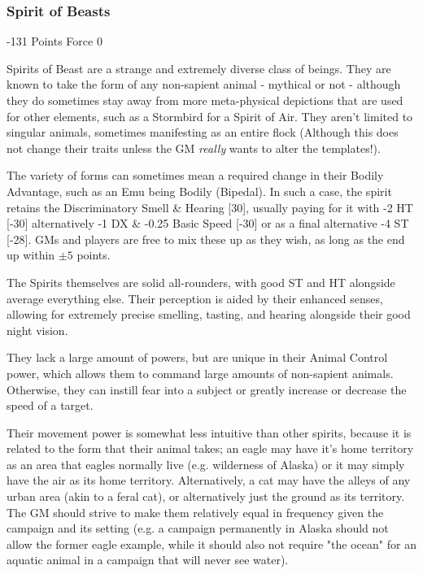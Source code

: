 \begin{multicols*}{3}
	\subsubsection{Spirit of Beasts}
	\begin{flushright}
		-131 Points Force 0
	\end{flushright}
	
	Spirits of Beast are a strange and extremely diverse class of beings. They are known to take the form of any non-sapient animal - mythical or not - although they do sometimes stay away from more meta-physical depictions that are used for other elements, such as a Stormbird for a Spirit of Air. They aren't limited to singular animals, sometimes manifesting as an entire flock (Although this does not change their traits unless the GM \textit{really }wants to alter the templates!).
	
	The variety of forms can sometimes mean a required change in their Bodily Advantage, such as an Emu being Bodily (Bipedal). In such a case, the spirit retains the Discriminatory Smell \& Hearing [30], usually paying for it with -2 HT [-30] alternatively -1 DX \& -0.25 Basic Speed [-30] or as a final alternative -4 ST [-28]. GMs and players are free to mix these up as they wish, as long as the end up within \(\pm5\) points.
	
	The Spirits themselves are solid all-rounders, with good ST and HT alongside average everything else. Their perception is aided by their enhanced senses, allowing for extremely precise smelling, tasting, and hearing alongside their good night vision.
	
	They lack a large amount of powers, but are unique in their Animal Control power, which allows them to command large amounts of non-sapient animals. Otherwise, they can instill fear into a subject or greatly increase or decrease the speed of a target. 
	
	Their movement power is somewhat less intuitive than other spirits, because it is related to the form that their animal takes; an eagle may have it's home territory as an area that eagles normally live (e.g. wilderness of Alaska) or it may simply have the air as its home territory. Alternatively, a cat may have the alleys of any urban area (akin to a feral cat), or alternatively just the ground as its territory. The GM should strive to make them relatively equal in frequency given the campaign and its setting (e.g. a campaign permanently in Alaska should not allow the former eagle example, while it should also not require "the ocean" for an aquatic animal in a campaign that will never see water).
	

\end{multicols*}
